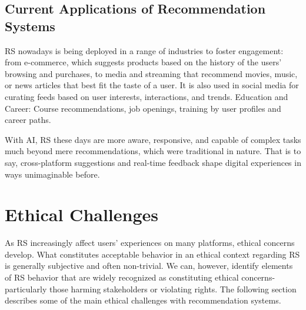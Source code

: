 \documentclass{article}
\begin{document}
\subsection{Current Applications of Recommendation Systems}

RS nowadays is being deployed in a range of industries to foster engagement: from e-commerce, which suggests products based on the history of the users' browsing and purchases, to media and streaming that recommend movies, music, or news articles that best fit the taste of a user. It is also used in social media for curating feeds based on user interests, interactions, and trends.
Education and Career: Course recommendations, job openings, training by user profiles and career paths.

With AI, RS these days are more aware, responsive, and capable of complex tasks much beyond mere recommendations, which were traditional in nature. That is to say, cross-platform suggestions and real-time feedback shape digital experiences in ways unimaginable before.
\section{Ethical Challenges}
As RS increasingly affect users' experiences on many platforms, ethical concerns develop. What constitutes acceptable behavior in an ethical context regarding RS is generally subjective and often non-trivial. We can, however, identify elements of RS behavior that are widely recognized as constituting ethical concerns-particularly those harming stakeholders or violating rights. The following section describes some of the main ethical challenges with recommendation systems.\cite{RS_ELI}\cite{IaAEC_in_RS}
\end{document}
